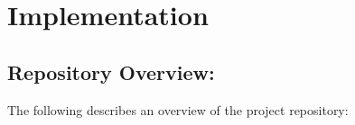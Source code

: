 \documentclass[12pt,a4paper,twoside,openright]{report}
\begin{document}

\chapter{Implementation}

\section{Repository Overview:}

\DTsetlength{0em}{1.3em}{0em}{0.7pt}{3pt}       
\setlength{\DTbaselineskip}{15pt}  %
\renewcommand{\DTstyle}{\ttfamily}

The following describes an overview of the project repository:
\medskip
\end{document}
